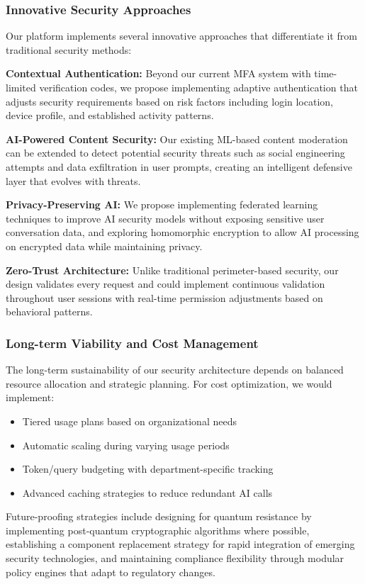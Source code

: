 \documentclass{article}
\begin{document}
\subsubsection{Innovative Security Approaches}
Our platform implements several innovative approaches that differentiate it from traditional security methods:

\textbf{Contextual Authentication:} Beyond our current MFA system with time-limited verification codes, we propose implementing adaptive authentication that adjusts security requirements based on risk factors including login location, device profile, and established activity patterns.

\textbf{AI-Powered Content Security:} Our existing ML-based content moderation can be extended to detect potential security threats such as social engineering attempts and data exfiltration in user prompts, creating an intelligent defensive layer that evolves with threats.

\textbf{Privacy-Preserving AI:} We propose implementing federated learning techniques to improve AI security models without exposing sensitive user conversation data, and exploring homomorphic encryption to allow AI processing on encrypted data while maintaining privacy.

\textbf{Zero-Trust Architecture:} Unlike traditional perimeter-based security, our design validates every request and could implement continuous validation throughout user sessions with real-time permission adjustments based on behavioral patterns.

\subsubsection{Long-term Viability and Cost Management}
The long-term sustainability of our security architecture depends on balanced resource allocation and strategic planning. For cost optimization, we would implement:

\begin{itemize}
    \item Tiered usage plans based on organizational needs
    \item Automatic scaling during varying usage periods
    \item Token/query budgeting with department-specific tracking
    \item Advanced caching strategies to reduce redundant AI calls
\end{itemize}

Future-proofing strategies include designing for quantum resistance by implementing post-quantum cryptographic algorithms where possible, establishing a component replacement strategy for rapid integration of emerging security technologies, and maintaining compliance flexibility through modular policy engines that adapt to regulatory changes.
\end{document}
